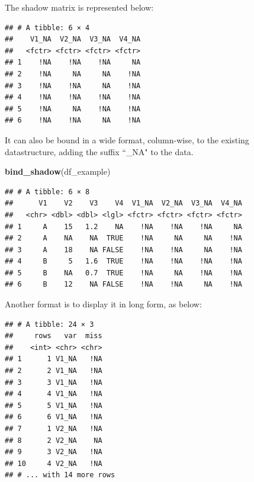 \documentclass[]{article}
\newenvironment{Shaded}{\begin{snugshade}}{\end{snugshade}}
\newcommand{\KeywordTok}[1]{\textcolor[rgb]{0.13,0.29,0.53}{\textbf{{#1}}}}
\newcommand{\DataTypeTok}[1]{\textcolor[rgb]{0.13,0.29,0.53}{{#1}}}
\newcommand{\DecValTok}[1]{\textcolor[rgb]{0.00,0.00,0.81}{{#1}}}
\newcommand{\StringTok}[1]{\textcolor[rgb]{0.31,0.60,0.02}{{#1}}}
\newcommand{\NormalTok}[1]{{#1}}
\begin{document}
The shadow matrix is represented below:

\begin{verbatim}
## # A tibble: 6 × 4
##    V1_NA  V2_NA  V3_NA  V4_NA
##   <fctr> <fctr> <fctr> <fctr>
## 1    !NA    !NA    !NA     NA
## 2    !NA     NA     NA    !NA
## 3    !NA    !NA     NA    !NA
## 4    !NA    !NA    !NA    !NA
## 5    !NA     NA    !NA    !NA
## 6    !NA    !NA     NA    !NA
\end{verbatim}

It can also be bound in a wide format, column-wise, to the existing
datastructure, adding the suffix ``\_NA" to the data.

\begin{Shaded}
\begin{Highlighting}[]
\KeywordTok{bind_shadow}\NormalTok{(df_example)}
\end{Highlighting}
\end{Shaded}

\begin{verbatim}
## # A tibble: 6 × 8
##      V1    V2    V3    V4  V1_NA  V2_NA  V3_NA  V4_NA
##   <chr> <dbl> <dbl> <lgl> <fctr> <fctr> <fctr> <fctr>
## 1     A    15   1.2    NA    !NA    !NA    !NA     NA
## 2     A    NA    NA  TRUE    !NA     NA     NA    !NA
## 3     A    18    NA FALSE    !NA    !NA     NA    !NA
## 4     B     5   1.6  TRUE    !NA    !NA    !NA    !NA
## 5     B    NA   0.7  TRUE    !NA     NA    !NA    !NA
## 6     B    12    NA FALSE    !NA    !NA     NA    !NA
\end{verbatim}

Another format is to display it in long form, as below:

\begin{Shaded}
\end{Shaded}

\begin{verbatim}
## # A tibble: 24 × 3
##     rows   var  miss
##    <int> <chr> <chr>
## 1      1 V1_NA   !NA
## 2      2 V1_NA   !NA
## 3      3 V1_NA   !NA
## 4      4 V1_NA   !NA
## 5      5 V1_NA   !NA
## 6      6 V1_NA   !NA
## 7      1 V2_NA   !NA
## 8      2 V2_NA    NA
## 9      3 V2_NA   !NA
## 10     4 V2_NA   !NA
## # ... with 14 more rows
\end{verbatim}
\end{document}
